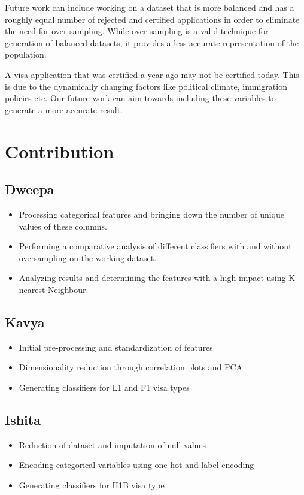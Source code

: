 \documentclass[conference]{IEEEtran}
\begin{document}
Future work can include working on a dataset that is more balanced and has a roughly equal number of rejected and certified applications in order to eliminate the need for over sampling. While over sampling is a valid technique for generation of balanced datasets, it provides a less accurate representation of the population.

A visa application that was certified a year ago may not be certified today. This is due to the dynamically changing factors like political climate, immigration policies etc. Our future work can aim towards including these variables to generate a more accurate result.

\section{Contribution}
\subsection{\textbf{Dweepa}}
\begin{itemize}
  \item Processing categorical features and bringing down the number of unique values of these columns.
  \item Performing a comparative analysis of different classifiers with and without oversampling on the working dataset.
  \item Analyzing results and determining the features with a high impact using K nearest Neighbour.
\end{itemize}
\subsection{\textbf{Kavya}}
\begin{itemize}
  \item Initial pre-processing and standardization of features
  \item Dimensionality reduction through correlation plots and PCA
  \item Generating classifiers for L1 and F1 visa types
\end{itemize}
\subsection{\textbf{Ishita}}
\begin{itemize}
  \item Reduction of dataset and imputation of null values
  \item Encoding categorical variables using one hot and label encoding
  \item Generating classifiers for H1B visa type
\end{itemize}
\end{document}
